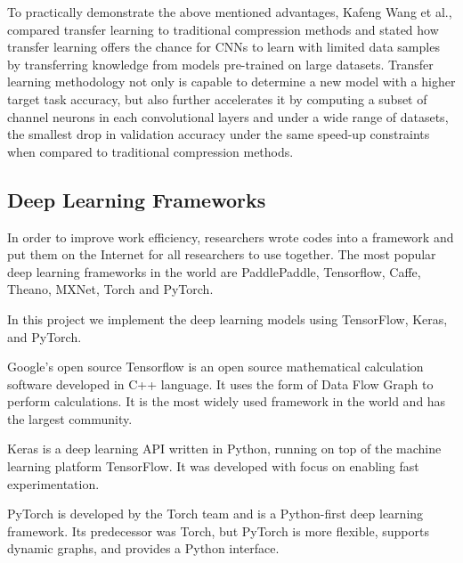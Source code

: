 \documentclass[conference]{IEEEtran}
\begin{document}
To practically demonstrate the above mentioned advantages, Kafeng Wang et al.,\cite{Wang2020PayAT} compared transfer learning to traditional compression methods and stated  how transfer learning offers the chance for CNNs to learn with limited data samples by transferring knowledge from models pre-trained on large datasets. Transfer learning methodology not only is capable to determine a new model with a higher target task accuracy, but also further accelerates it by computing a subset of channel neurons in each convolutional layers and under a wide range of datasets, the smallest drop in validation accuracy under the same speed-up constraints when compared to traditional compression methods.


\subsection{ Deep Learning Frameworks}
In order to improve work efficiency, researchers wrote codes into a framework and put them on the Internet for all researchers to use together. The most popular deep learning frameworks in the world are PaddlePaddle, Tensorflow, Caffe, Theano, MXNet, Torch and PyTorch. 

In this project we implement the deep learning models using TensorFlow, Keras, and PyTorch. 

Google's open source Tensorflow is an open source mathematical calculation software developed in C++ language. It uses the form of Data Flow Graph to perform calculations. It is the most widely used framework in the world and has the largest community. 

Keras is a deep learning API written in Python, running on top of the machine learning platform TensorFlow. It was developed with focus on enabling fast experimentation.

PyTorch is developed by the Torch team and is a Python-first deep learning framework. Its predecessor was Torch, but PyTorch is more flexible, supports dynamic graphs, and provides a Python interface. 

 
\end{document}
